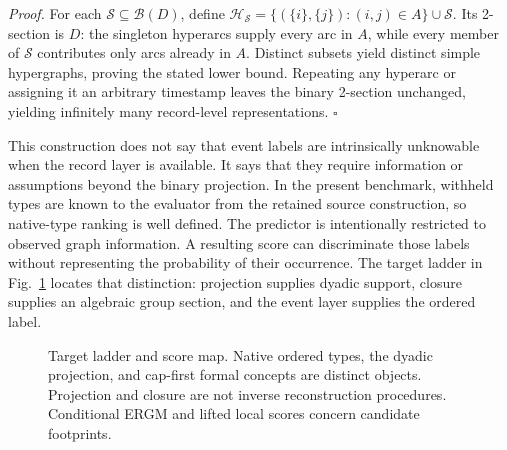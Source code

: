 \documentclass[10pt]{article}
\begin{document}
\emph{Proof.} For each $\mathcal S\subseteq\mathcal B(D)$, define $\mathcal H_{\mathcal S}=\{(\{i\},\{j\}):(i,j)\in A\}\cup\mathcal S$. Its 2-section is $D$: the singleton hyperarcs supply every arc in $A$, while every member of $\mathcal S$ contributes only arcs already in $A$. Distinct subsets yield distinct simple hypergraphs, proving the stated lower bound. Repeating any hyperarc or assigning it an arbitrary timestamp leaves the binary 2-section unchanged, yielding infinitely many record-level representations. \hfill$\square$

This construction does not say that event labels are intrinsically unknowable when the record layer is available. It says that they require information or assumptions beyond the binary projection. In the present benchmark, withheld types are known to the evaluator from the retained source construction, so native-type ranking is well defined. The predictor is intentionally restricted to observed graph information. A resulting score can discriminate those labels without representing the probability of their occurrence. The target ladder in Fig.~\ref{fig:ladder} locates that distinction: projection supplies dyadic support, closure supplies an algebraic group section, and the event layer supplies the ordered label.

\begin{figure}[t]
\centering
{}
\caption{Target ladder and score map. Native ordered types, the dyadic projection, and cap-first formal concepts are distinct objects. Projection and closure are not inverse reconstruction procedures. Conditional ERGM and lifted local scores concern candidate footprints.}
\label{fig:ladder}
\end{figure}
\end{document}
